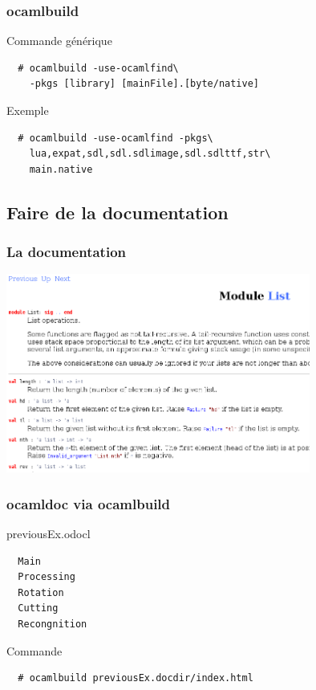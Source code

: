 \begin{frame}[fragile]
	\frametitle{ocamlbuild}
	\begin{block}{Commande générique}
		\begin{lstlisting}
  # ocamlbuild -use-ocamlfind\
    -pkgs [library] [mainFile].[byte/native]
		\end{lstlisting}
	\end{block}
	\begin{block}{Exemple}
		\begin{lstlisting}
  # ocamlbuild -use-ocamlfind -pkgs\
    lua,expat,sdl,sdl.sdlimage,sdl.sdlttf,str\
    main.native
		\end{lstlisting}
	\end{block}
\end{frame}

\subsection{Faire de la documentation} %
\begin{frame}
	\frametitle{La documentation}
	\begin{center}
		\includegraphics[width=10cm]{pics/doc.png}
	\end{center}
\end{frame}

\begin{frame}[fragile]
	\frametitle{ocamldoc via ocamlbuild}
	\begin{block}{previousEx.odocl}
		\begin{lstlisting}
  Main
  Processing
  Rotation
  Cutting
  Recongnition
		\end{lstlisting}
	\end{block}
	\begin{block}{Commande}
		\begin{lstlisting}
  # ocamlbuild previousEx.docdir/index.html
		\end{lstlisting}
	\end{block}
\end{frame}

